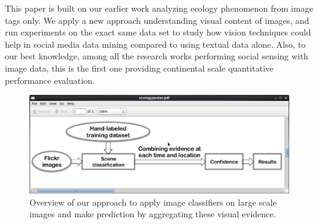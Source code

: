 This paper is built on our earlier work  analyzing ecology phenomenon from image tags only. We apply a new approach understanding visual content of images, and run experiments on the exact same data set to study how vision techniques could help in social media data mining compared to using textual data alone. Also, to our best knowledge, among all the research works performing social sensing with image data, this is the first one providing continental scale quantitative performance evaluation.


\begin{figure}
\centering
\includegraphics[scale=.3]{figure/overview.png}
\caption{Overview of our approach to apply image classifiers on large scale images and make prediction by aggregating these visual evidence. }
\label{fig:overview}
\end{figure}


